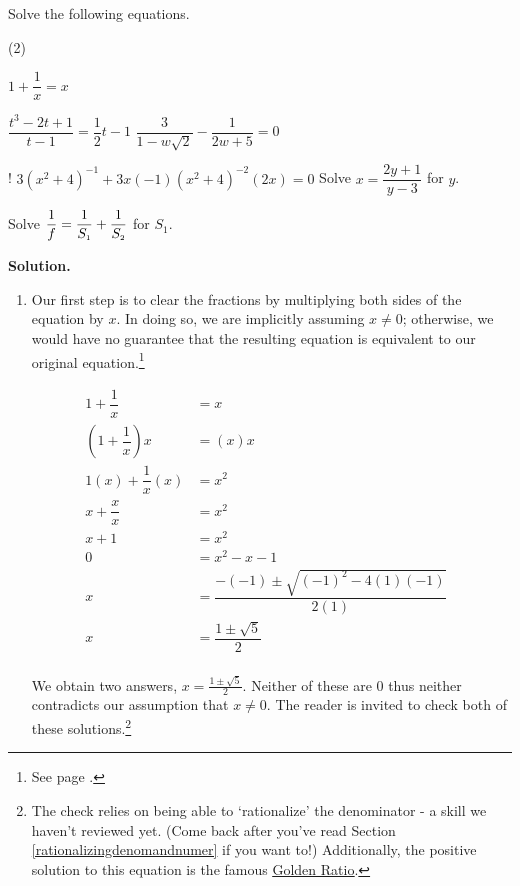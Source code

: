 \begin{ex}\label{rateqnreviewex} Solve the following equations.

\begin{tasks}(2)

\task  $1 + \dfrac{1}{x} = x$

\task  $\dfrac{t^3-2t+1}{t-1} = \dfrac{1}{2}t-1$
\task  $\dfrac{3}{1 - w\sqrt{2}} - \dfrac{1}{2w+5} = 0$

\task! $3(x^2+4)^{-1} + 3x(-1)(x^2+4)^{-2}(2x) = 0$
\task  Solve $x = \dfrac{2y+1}{y-3}$ for $y$. 

\task  Solve $\dfrac{1}{f} = \dfrac{1}{S_{\text{\tiny $1$}}} + \dfrac{1}{S_{\text{\tiny $2$}}}$ for $S_{1}$.

\end{tasks}

{\bf Solution.} 

\begin{enumerate}

\item   Our first step is to clear the fractions by multiplying both sides of the equation by $x$. In doing so, we are implicitly assuming $x \neq 0$; otherwise, we would have no guarantee that the resulting equation is equivalent to our original equation.\footnote{See page \pageref{equivalenteqnineq}.}

\begin{align*}
1 + \dfrac{1}{x} & = x & \\ 
\left(1 + \dfrac{1}{x}\right) x & = (x)x \tag{Provided $x \neq 0$} \\ 
1(x) + \dfrac{1}{x} (x) & = x^2 \tag{Distribute} \\ 
x + \dfrac{x}{x} & = x^2 \tag{Multiply} \\ 
x + 1 & = x^2 &  \\
0 & = x^2 - x - 1 \tag{Subtract $x$, subtract $1$} \\ 
x & = \dfrac{-(-1) \pm \sqrt{(-1)^2 - 4(1)(-1)}}{2(1)} \tag{Quadratic Formula} \\
x & = \dfrac{1 \pm \sqrt{5}}{2} \tag{Simplify} \\
\end{align*}

We obtain two answers, $x = \frac{1 \pm \sqrt{5}}{2}$.  Neither of these are $0$ thus neither contradicts our assumption that $x \neq 0$.  The reader is invited to check both of these solutions.\footnote{The check relies on being able to `rationalize' the denominator  - a skill we haven't reviewed yet. (Come back after you've read Section \ref{rationalizingdenomandnumer} if you want to!)  Additionally, the positive solution to this equation is the famous \href{http://en.wikipedia.org/wiki/Golden_ratio}{\underline{Golden Ratio}}.}


\end{enumerate}
\end{ex}
